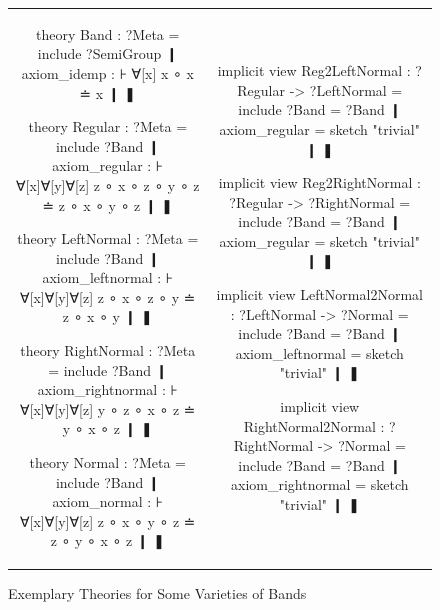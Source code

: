 \begin{figure}
\begin{tabular}{c|c}
\begin{mmtcode}
theory Band : ?Meta =
  include ?SemiGroup ❙	
  axiom_idemp : ⊦ ∀[x] x ∘ x ≐ x ❙
❚

theory Regular : ?Meta =
  include ?Band ❙
  axiom_regular : ⊦ ∀[x]∀[y]∀[z] 
    z ∘ x ∘ z ∘ y ∘ z ≐ z ∘ x ∘ y ∘ z ❙
❚

theory LeftNormal : ?Meta =
  include ?Band ❙
  axiom_leftnormal : ⊦ ∀[x]∀[y]∀[z] 
    z ∘ x ∘ z ∘ y ≐ z ∘ x ∘ y ❙ 
❚

theory RightNormal : ?Meta =
  include ?Band ❙
  axiom_rightnormal : ⊦ ∀[x]∀[y]∀[z] 
    y ∘ z ∘ x ∘ z ≐ y ∘ x ∘ z ❙ 
❚

theory Normal : ?Meta =
  include ?Band ❙
  axiom_normal :  ⊦ ∀[x]∀[y]∀[z] 
    z ∘ x ∘ y ∘ z ≐ z ∘ y ∘ x ∘ z ❙
❚
\end{mmtcode} &
\begin{mmtcode}
implicit view Reg2LeftNormal : 
    ?Regular -> ?LeftNormal =
  include ?Band = ?Band ❙
  axiom_regular = sketch "trivial" ❙
❚

implicit view Reg2RightNormal : 
    ?Regular -> ?RightNormal =
  include ?Band = ?Band ❙
  axiom_regular = sketch "trivial" ❙
❚

implicit view LeftNormal2Normal : 
    ?LeftNormal -> ?Normal =
  include ?Band = ?Band ❙
  axiom_leftnormal = sketch "trivial" ❙
❚

implicit view RightNormal2Normal : 
    ?RightNormal -> ?Normal =
  include ?Band = ?Band ❙
  axiom_rightnormal = sketch "trivial" ❙
❚
\end{mmtcode}
\end{tabular}

\caption{Exemplary Theories for Some Varieties of Bands}\label{fig:bandsmmt}
\end{figure}